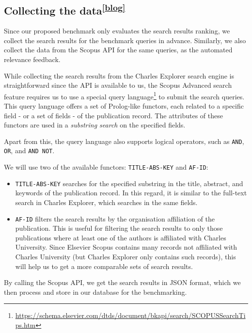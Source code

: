 \subsection[Collecting the data]{Collecting the data\textsuperscript{\href{https://barjin.github.io/edu/thesis-blog/collecting-data/}{[blog]}}}\label{collecting-data}

Since our proposed benchmark only evaluates the search results ranking, we collect the search results for the benchmark queries in advance.
Similarly, we also collect the data from the Scopus API for the same queries, as the automated relevance feedback.

While collecting the search results from the Charles Explorer search engine is straightforward since the API is available to us, 
the Scopus Advanced search feature requires us to use a special query language\footnote{\url{https://schema.elsevier.com/dtds/document/bkapi/search/SCOPUSSearchTips.htm}} to submit the search queries. 
This query language offers a set of Prolog-like functors, 
each related to a specific field - or a set of fields - of the publication record. 
The attributes of these functors are used in a \textit{substring search} on the specified fields.

Apart from this, the query language also supports logical operators, such as \texttt{AND}, \texttt{OR}, and \texttt{AND NOT}.

We will use two of the available functors: \texttt{TITLE-ABS-KEY} and \texttt{AF-ID}:

\begin{itemize}
    \item \texttt{TITLE-ABS-KEY} searches for the specified substring in the title, abstract, and keywords of the publication record. 
    In this regard, it is similar to the full-text search in Charles Explorer, which searches in the same fields.
    \item \texttt{AF-ID} filters the search results by the organisation affiliation of the publication. This is useful for filtering the search results to only those publications where at least one of the authors is affiliated with Charles University. Since Elsevier Scopus contains many records not affiliated with Charles University (but Charles Explorer only contains such records), this will help us to get a more comparable sets of search results.
\end{itemize}

By calling the Scopus API, we get the search results in JSON format, which we then process and store in our database for the benchmarking.

